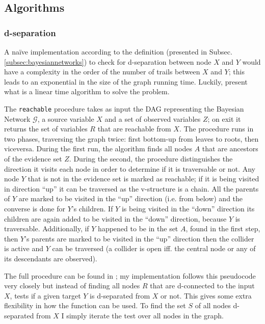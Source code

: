 \subsection{Algorithms}
\subsubsection{d-separation}
A na{\"i}ve implementation according to the definition (presented in Subsec. \ref{subsec:bayesiannetworks}) to check for d-separation between node $X$ and $Y$ would have a complexity in the order of the number of trails between $X$ and $Y$; this leads to an exponential in the size of the graph running time.
Luckily, \cite{koller2007dseparation} present what is a linear time algorithm to solve the problem.

The \texttt{reachable} procedure takes as input the DAG representing the Bayesian Network $\mathcal{G}$, a source variable $X$ and a set of observed variables $Z$; on exit it returns the set of variables $R$ that are reachable from $X$.
The procedure runs in two phases, traversing the graph twice: first bottom-up from leaves to roots, then viceversa.
During the first run, the algorithm finds all nodes $A$ that are ancestors of the evidence set $Z$.
During the second, the procedure distinguishes the direction it visits each node in order to determine if it is traversable or not.
Any node $Y$ that is not in the evidence set is marked as reachable; if it is being visited in direction \enquote{up} it can be traversed as the v-structure is a chain.
All the parents of $Y$ are marked to be visited in the \enquote{up} direction (i.e. from below) and the converse is done for $Y$'s children.
If $Y$ is being visited in the \enquote{down} direction its children are again added to be visited in the \enquote{down} direction, because $Y$ is traversable.
Additionally, if $Y$ happened to be in the set $A$, found in the first step, then $Y$'s parents are marked to be visited in the \enquote{up} direction then the collider is active and $Y$ can be traversed (a collider is open iff. the central node or any of its descendants are observed).

The full procedure can be found in \cite{koller2007dseparation}; my implementation follows this pseudocode very closely but instead of finding all nodes $R$ that are d-connected to the input $X$, tests if a given target $Y$ is d-separated from $X$ or not.
This gives some extra flexibility in how the function can be used.
To find the set $S$ of all nodes d-separated from $X$ I simply iterate the test over all nodes in the graph.
 
